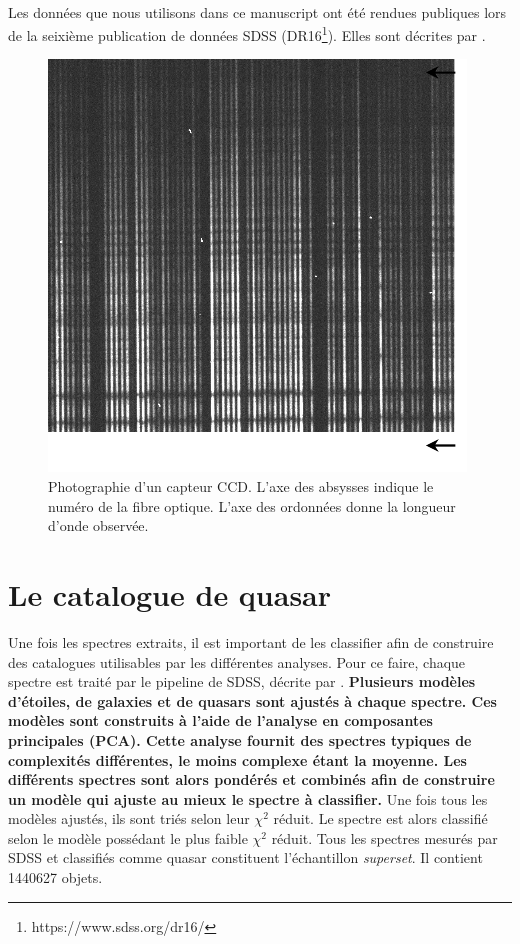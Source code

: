 \documentclass[11pt, twoside, a4paper, openright]{report}
\begin{document}
\paragraph{}
Les données que nous utilisons dans ce manuscript ont été rendues publiques lors de la seixième publication de données SDSS (DR16\footnote{https://www.sdss.org/dr16/}). Elles sont décrites par \citet{Ahumada2019}.
\begin{figure}
  \centering
  \includegraphics[scale=0.8]{photo_ccd.pdf}
  \caption{Photographie d'un capteur CCD. L'axe des absysses indique le numéro de la fibre optique. L'axe des ordonnées donne la longueur d'onde observée.}
  \label{fig:photo_ccd}
\end{figure}

\section{Le catalogue de quasar}
Une fois les spectres extraits, il est important de les classifier afin de construire des catalogues utilisables par les différentes analyses. Pour ce faire, chaque spectre est traité par le pipeline de SDSS, décrite par \citet{bolton_spectral_2012}.
\textbf{Plusieurs modèles d'étoiles, de galaxies et de quasars sont ajustés à chaque spectre. Ces modèles sont construits à l'aide de l'analyse en composantes principales (PCA). Cette analyse fournit des spectres typiques de complexités différentes, le moins complexe étant la moyenne. Les différents spectres sont alors pondérés et combinés afin de construire un modèle qui ajuste au mieux le spectre à classifier.}
Une fois tous les modèles ajustés, ils sont triés selon leur $\chi^{2}$ réduit. Le spectre est alors classifié selon le modèle possédant le plus faible $\chi^{2}$ réduit.
Tous les spectres mesurés par SDSS et classifiés comme quasar constituent l'échantillon \emph{superset}. Il contient \num{1440627} objets.
\end{document}
